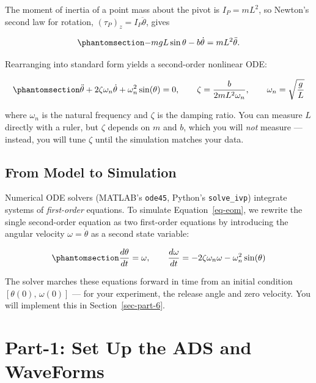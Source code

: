 \documentclass[
  12pt,
  letterpaper,
]{article}
\begin{document}
The moment of inertia of a point mass about the pivot is \(I_P = mL^2\),
so Newton's second law for rotation,
\(\left(\tau_P\right)_z = I_P \ddot{\theta}\), gives

\begin{equation}\protect\phantomsection\label{eq-eom-raw}{-mgL\sin\theta - b\dot{\theta} = mL^2 \ddot{\theta}.}\end{equation}

Rearranging into standard form yields a second-order nonlinear ODE:

\begin{equation}\protect\phantomsection\label{eq-eom}{\ddot{\theta} + 2\zeta\omega_n \dot{\theta} + \omega_n^2 \sin(\theta) = 0, \qquad \zeta = \frac{b}{2mL^2\omega_n}, \qquad \omega_n = \sqrt{\frac{g}{L}}}\end{equation}

where \(\omega_n\) is the natural frequency and \(\zeta\) is the damping
ratio. You can measure \(L\) directly with a ruler, but \(\zeta\)
depends on \(m\) and \(b\), which you will \emph{not} measure ---
instead, you will tune \(\zeta\) until the simulation matches your data.

\subsection{From Model to Simulation}\label{sec-model-to-sim}

Numerical ODE solvers (MATLAB's \texttt{ode45}, Python's
\texttt{solve\_ivp}) integrate systems of \emph{first-order} equations.
To simulate Equation~\ref{eq-eom}, we rewrite the single second-order
equation as two first-order equations by introducing the angular
velocity \(\omega = \dot\theta\) as a second state variable:

\begin{equation}\protect\phantomsection\label{eq-state-space}{\frac{d\theta}{dt} = \omega, \qquad \frac{d\omega}{dt} = -2\zeta\omega_n\omega - \omega_n^2\sin(\theta)}\end{equation}

The solver marches these equations forward in time from an initial
condition \(\left[\theta(0),\, \omega(0)\right]\) --- for your
experiment, the release angle and zero velocity. You will implement this
in Section~\ref{sec-part-6}.

\newpage{}

\section{Part-1: Set Up the ADS and WaveForms}\label{sec-part-1}
\end{document}
